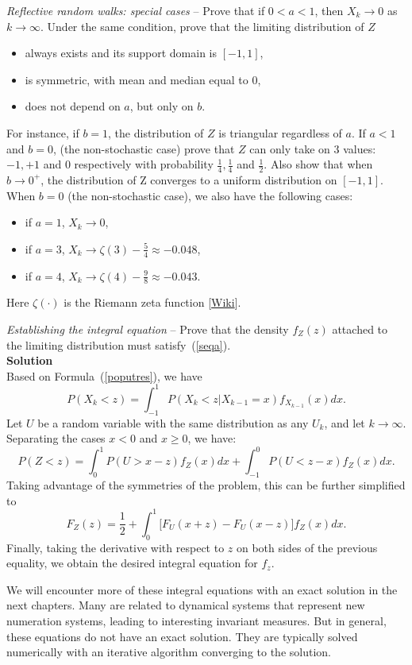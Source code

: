 \documentclass[oneside,10pt]{book}
\newcommand{\qed}{\nobreak \ifvmode \relax \else
      \ifdim\lastskip<1.5em \hskip-\lastskip
      \hskip1.5em plus0em minus0.5em \fi \nobreak
      \vrule height0.75em width0.5em depth0.25em\fi}
\begin{document}
\begin{Exercise} {\em Reflective random walks: special cases} -- Prove that if $0<a < 1$, then  $X_k\rightarrow 0$ as
$k\rightarrow\infty$. Under the same condition, prove that the limiting distribution of $Z$
\begin{itemize}
\item	always exists and its support domain is $[-1, 1]$,
\item is symmetric, with mean and median equal to 0,
\item does not depend on $a$, but only on $b$.
\end{itemize}
For instance, if $b =1$, the distribution of $Z$ is triangular regardless of $a$. If $a < 1$ and $b = 0$, (the non-stochastic case) prove that 
$Z$ can only take on 3 values: $-1,+1$ and $0$ respectively with probability $\frac{1}{4},\frac{1}{4}$ and $\frac{1}{2}$.
Also show that when $b\rightarrow 0^{+}$,  the distribution of Z converges to a uniform distribution on $[-1, 1]$. 
When $b=0$ (the non-stochastic case), we also have the following cases:
\begin{itemize}
\item if $a=1$, $X_k\rightarrow 0$,
\item 	if $a = 3$, $X_k\rightarrow \zeta(3) -\frac{5}{4}\approx -0.048$,   
\item	if $a = 4$, $X_k\rightarrow \zeta(4) -\frac{9}{8}\approx -0.043$.
\end{itemize}
Here $\zeta(\cdot)$ is the \textcolor{index}{Riemann zeta function} [\href{https://en.wikipedia.org/wiki/Riemann_zeta_function}{Wiki}]. 
\end{Exercise}

\begin{Exercise}\label{knorr} {\em Establishing the integral equation} -- Prove that the density $f_Z(z)$ attached to the limiting distribution must
satisfy~(\ref{seqa}). \vspace{1ex} \\ 
{\bf Solution} \\
Based on Formula~(\ref{poputres}), we have
$$
P(X_k<z) = \int_{-1}^1 P(X_k < z | X_{k-1} = x) f_{X_{k-1}}(x) dx.
$$
Let $U$ be a random variable with the same distribution as any $U_k$, and let $k\rightarrow\infty$. Separating the cases $x<0$ and $x\geq 0$, we have:
$$
P(Z<z) = \int_0^1 P(U > x-z )f_Z(x)dx + \int_{-1}^0 P(U < z-x )f_Z(x)dx.
$$  
Taking advantage of the symmetries of the problem, this can be further simplified to
$$
F_Z(z) = \frac{1}{2} + \int_0^1 \Big[F_U(x+z)-F_U(x-z)\Big] f_Z(x)dx.
$$
Finally, taking the derivative with respect to $z$ on both sides of the previous equality, we obtain the desired integral equation for $f_z$. \qed

We will encounter more of these integral equations with an exact solution in the next chapters. Many are related to dynamical systems that represent new numeration systems, leading to interesting invariant measures. But in general, these equations do not have an exact solution. They are typically solved numerically with an iterative algorithm converging to the solution.  

\end{Exercise}
\end{document}
